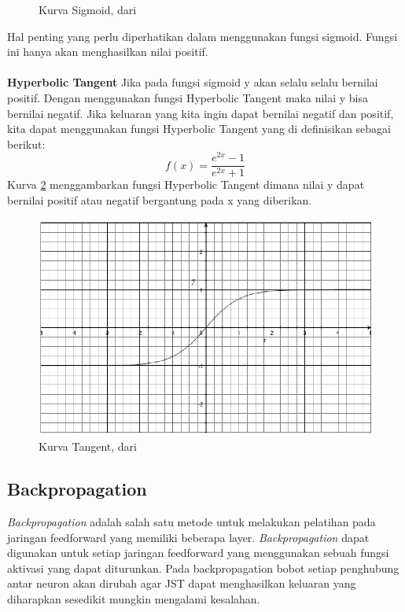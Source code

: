 \begin{enumerate}
\begin{figure}
	\caption[Kurva Sigmoid, dari \cite{IntroNNforJava:2015}]{Kurva Sigmoid, dari \cite{IntroNNforJava:2015}} 
	\label{fig:k_sigmoid}
	\end{figure}
Hal penting yang perlu diperhatikan dalam menggunakan fungsi sigmoid. Fungsi ini hanya akan menghasilkan nilai positif.\\\\
\textbf{Hyperbolic Tangent}
Jika pada fungsi sigmoid y akan selalu selalu bernilai positif. Dengan menggunakan fungsi Hyperbolic Tangent maka nilai y bisa bernilai negatif. Jika keluaran yang kita ingin dapat bernilai negatif dan positif, kita dapat menggunakan fungsi Hyperbolic Tangent yang di definisikan sebagai berikut:
\begin{displaymath}
	f(x)=\frac{e^{2x}-1}{e^{2x}+1}
\end{displaymath}
Kurva \ref{fig:k_tangent} menggambarkan fungsi Hyperbolic Tangent dimana nilai y dapat bernilai positif atau negatif bergantung pada x yang diberikan.
\begin{figure}
	\centering
	\includegraphics[width=0.6\linewidth]{Gambar/mine/tangent}
	\caption[Kurva Tangent, dari \cite{IntroNNforJava:2015}]{Kurva Tangent, dari \cite{IntroNNforJava:2015}} 
	\label{fig:k_tangent}
	\end{figure}
\end{enumerate}
\subsection{Backpropagation}
\textit{Backpropagation} adalah salah satu metode untuk melakukan pelatihan pada jaringan feedforward yang memiliki beberapa layer. \textit{Backpropagation} dapat digunakan untuk setiap jaringan feedforward yang menggunakan sebuah fungsi aktivasi yang dapat diturunkan. Pada backpropagation bobot setiap penghubung antar neuron akan dirubah agar JST dapat menghasilkan keluaran yang diharapkan sesedikit mungkin mengalami kesalahan.\\\\ 
